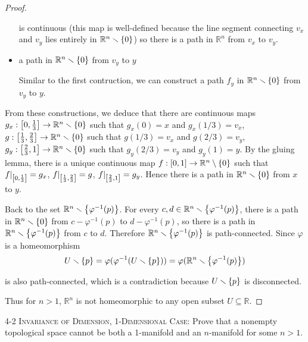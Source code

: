 \begin{proof}
\begin{itemize}
		      is continuous (this map is well-defined because the line segment connecting $v_{x}$ and $v_{y}$ lies entirely in $\mathbb{R}^{n}\smallsetminus\left\{{0}\right\}$) so there is a path in $\mathbb{R}^{n}$ from $v_{x}$ to $v_{y}$.
		\item a path in $\mathbb{R}^{n}\smallsetminus\left\{{0}\right\}$ from $v_{y}$ to $y$

		      Similar to the first contruction, we can construct a path $f_{y}$ in $\mathbb{R}^{n}\smallsetminus\left\{{0}\right\}$ from $v_{y}$ to $y$.
	\end{itemize}

	From these constructions, we deduce that there are continuous maps $g_{x}: \left[{0, \frac{1}{3}}\right] \to \mathbb{R}^{n}\smallsetminus\left\{{0}\right\}$ such that $g_{x}(0) = x$ and $g_{x}(1/3) = v_{x}$, $g: \left[{\frac{1}{3}, \frac{2}{3}}\right] \to \mathbb{R}^{n}\smallsetminus\left\{{0}\right\}$ such that $g(1/3) = v_{x}$ and $g(2/3) = v_{y}$, $g_{y}: \left[{\frac{2}{3}, 1}\right] \to \mathbb{R}^{n}\smallsetminus\left\{{0}\right\}$ such that $g_{y}(2/3) = v_{y}$ and $g_{y}(1) = y$. By the gluing lemma, there is a unique continuous map $f: \left[{0, 1}\right] \to \mathbb{R}^{n}\setminus \left\{{0}\right\}$ such that $f\vert_{\left[{0, \frac{1}{3}}\right]} = g_{x}$, $f\vert_{\left[{\frac{1}{3}, \frac{2}{3}}\right]} = g$, $f\vert_{\left[{\frac{2}{3}, 1}\right]} = g_{y}$. Hence there is a path in $\mathbb{R}^{n}\smallsetminus\left\{{0}\right\}$ from $x$ to $y$.

	Back to the set $\mathbb{R}^{n}\smallsetminus\left\{{\varphi^{-1}(p)}\right\}$. For every $c, d \in \mathbb{R}^{n}\smallsetminus\left\{{\varphi^{-1}(p)}\right\}$, there is a path in $\mathbb{R}^{n}\smallsetminus\left\{{0}\right\}$ from $c - \varphi^{-1}(p)$ to $d - \varphi^{-1}(p)$, so there is a path in $\mathbb{R}^{n}\smallsetminus\left\{{\varphi^{-1}(p)}\right\}$ from $c$ to $d$. Therefore $\mathbb{R}^{n}\smallsetminus\left\{{\varphi^{-1}(p)}\right\}$ is path-connected. Since $\varphi$ is a homeomorphism
	\begin{equation*}
		U\smallsetminus\left\{{p}\right\} = \varphi(\varphi^{-1}(U\smallsetminus\left\{{p}\right\})) = \varphi(\mathbb{R}^{n}\smallsetminus\left\{{\varphi^{-1}(p)}\right\})
	\end{equation*}

	is also path-connected, which is a contradiction because $U\smallsetminus\left\{{p}\right\}$ is disconnected.

	Thus for $n > 1$, $\mathbb{R}^{n}$ is not homeomorphic to any open subset $U\subseteq \mathbb{R}$.
\end{proof}

\begin{problem}{4-2}\label{problem:4-2}
\textsc{Invariance of Dimension, 1-Dimensional Case:} Prove that a nonempty topological space cannot be both a 1-manifold and an $n$-manifold for some $n > 1$.
\end{problem}

